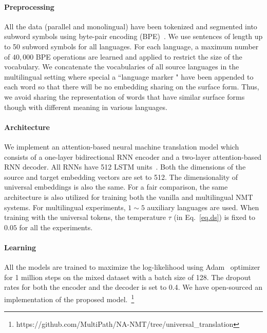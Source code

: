 \paragraph{Preprocessing}
All the data (parallel and monolingual) have been tokenized and segmented into subword symbols using byte-pair encoding (BPE)~\cite{sennrich2015neural}. We use sentences of length up to 50 subword symbols for all languages.  For each language, a maximum number of $40,000$ BPE operations are  learned and  applied to restrict the size of the vocabulary.  We concatenate the vocabularies of all source languages in the multilingual setting where special a ``language marker " have been appended to each word  so that there will be no embedding sharing on the surface form. Thus, we avoid sharing the representation  of words that have similar surface forms though with different meaning in various languages.

\paragraph{Architecture} We implement an attention-based neural machine translation model which consists of a one-layer bidirectional RNN encoder and a two-layer attention-based RNN decoder. All  RNNs have 512 LSTM units~\cite{hochreiter1997long}. Both the dimensions of the source and target embedding vectors are set to 512. The dimensionality of universal embeddings is also the same. For a fair comparison, the same architecture is also utilized for training both the vanilla and multilingual NMT systems. For multilingual experiments, $1\sim 5$ auxiliary languages are used.  When training with the universal tokens, the temperature $\tau$ (in Eq.~\ref{eq.ds}) is fixed to $0.05$ for all the experiments.

\paragraph{Learning}
All the models are trained to maximize the log-likelihood using Adam~\cite{kingma2014adam} optimizer for 1 million steps on the mixed dataset with a batch size of 128. The dropout rates for both the encoder and the decoder is set to 0.4. %
We have open-sourced an implementation of the proposed model.~\footnote{https://github.com/MultiPath/NA-NMT/tree/universal\_translation}


